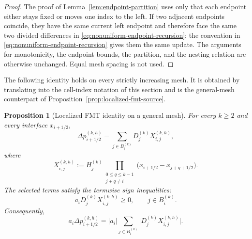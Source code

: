 \documentclass[11pt]{amsart}
\theoremstyle{plain}
\newtheorem{proposition}[theorem]{Proposition}
\theoremstyle{definition}
\theoremstyle{remark}
\numberwithin{equation}{section}
\theoremstyle{plain}
\begin{document}
\begin{proof}
	The proof of Lemma~\ref{lem:endpoint-partition} uses only that each endpoint
	either stays fixed or moves one index to the left.  If two adjacent
	endpoints coincide, they have the same current left endpoint and therefore 
	face the same two divided differences in
	\eqref{eq:nonuniform-endpoint-recursion};
	the convention in \eqref{eq:nonuniform-endpoint-recursion} gives them
	the same update.  The arguments for monotonicity, the endpoint
	bounds, the partition, and the nesting relation are otherwise unchanged.
	Equal mesh spacing is not used.
\end{proof}

The following identity holds on every strictly increasing mesh.  It is obtained
by translating \cite[Lemmas~2.1 and~2.2]{FMT} into the cell-index notation of this
section and is the general-mesh counterpart of
Proposition~\ref{prop:localized-fmt-source}.

\begin{proposition}[\texorpdfstring{Localized FMT identity on a general mesh}{Localized FMT identity on a general mesh}]
	\label{prop:nonuniform-localized-fmt}
	For every $k\ge2$ and every interface $x_{i+1/2}$,
	\begin{equation}\label{eq:nonuniform-fmt-expansion}
		\Delta p_{i+1/2}^{(k,h)}
		=
		\sum_{j\in B_i^{(k)}}
		D_j^{(k)}X_{i,j}^{(k,h)},
	\end{equation}
	where
	\begin{equation}\label{eq:nonuniform-fmt-coefficient}
		X_{i,j}^{(k,h)}
		:=
		H_j^{(k)}
		\prod_{\substack{0\le q\le k-1\\j+q\ne i}}
		\bigl(x_{i+1/2}-x_{j+q+1/2}\bigr).
	\end{equation}
	The selected terms satisfy the termwise sign inequalities:
	\begin{equation}\label{eq:nonuniform-fmt-termwise-sign}
		a_iD_j^{(k)}X_{i,j}^{(k,h)}\ge0,
		\qquad j\in B_i^{(k)}.
	\end{equation}
	Consequently,
	\begin{equation}\label{eq:nonuniform-fmt-positive-identity}
		a_i\Delta p_{i+1/2}^{(k,h)}
		=
		|a_i|
		\sum_{j\in B_i^{(k)}}
		\bigl|D_j^{(k)}X_{i,j}^{(k,h)}\bigr|.
	\end{equation}
\end{proposition}
\end{document}
